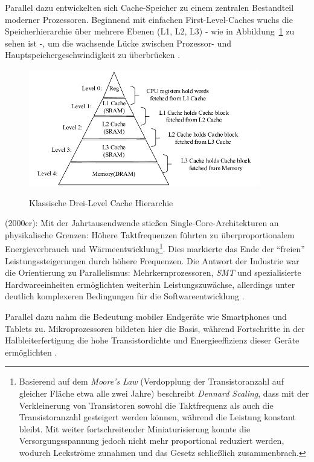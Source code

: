 Parallel dazu entwickelten sich Cache-Speicher zu einem zentralen Bestandteil moderner Prozessoren. Beginnend mit einfachen First-Level-Caches wuchs die Speicherhierarchie über mehrere Ebenen (L1, L2, L3) - wie in Abbildung~\ref{fig:cache_hierarchie} zu sehen ist -, um die wachsende Lücke zwischen Prozessor- und Hauptspeichergeschwindigkeit zu überbrücken \parencite[S.~2]{hennessy_computer_2011}.

\begin{figure}[htbp]
    \centering
    \includegraphics[width=0.90\textwidth]{img/Cache-Hierarchie.png}
    \caption{Klassische Drei-Level Cache Hierarchie}
	\cite{gao_cspm_2022}
    \label{fig:cache_hierarchie}
\end{figure}

(2000er): Mit der Jahrtausendwende stießen Single-Core-Architekturen an physikalische Grenzen: Höhere Taktfrequenzen führten zu überproportionalem Energieverbrauch und Wärmeentwicklung\footnote{Basierend auf dem \textit{Moore’s Law} (Verdopplung der Transistoranzahl auf gleicher Fläche etwa alle zwei Jahre) beschreibt \textit{Dennard Scaling}, dass mit der Verkleinerung von Transistoren sowohl die Taktfrequenz als auch die Transistoranzahl gesteigert werden können, während die Leistung konstant bleibt. Mit weiter fortschreitender Miniaturisierung konnte die Versorgungsspannung jedoch nicht mehr proportional reduziert werden, wodurch Leckströme zunahmen und das Gesetz schließlich zusammenbrach.}. Dies markierte das Ende der \enquote{freien} Leistungssteigerungen durch höhere Frequenzen. Die Antwort der Industrie war die Orientierung zu Parallelismus: Mehrkernprozessoren, \textit{\ac{SMT}} und spezialisierte Hardwareeinheiten ermöglichten weiterhin Leistungszuwächse, allerdings unter deutlich komplexeren Bedingungen für die Softwareentwicklung \parencites[S.~3f]{shalf_new_2007}[S.~67f]{parkhurst_single_2006}.

Parallel dazu nahm die Bedeutung mobiler Endgeräte wie Smartphones und Tablets zu. Mikroprozessoren bildeten hier die Basis, während Fortschritte in der Halbleiterfertigung die hohe Transistordichte und Energieeffizienz dieser Geräte ermöglichten \parencite[S.~2]{hennessy_computer_2011}.

